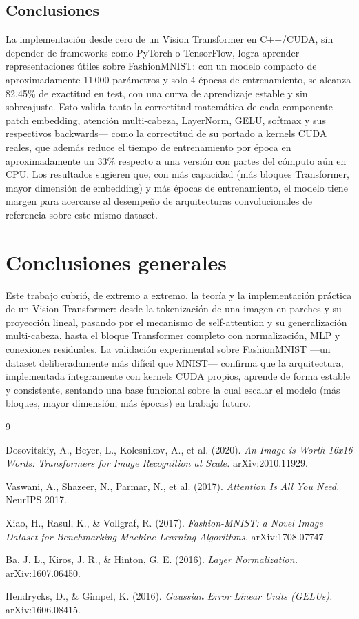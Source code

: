 \documentclass[11pt,a4paper]{article}
\begin{document}
\subsection{Conclusiones}

La implementación desde cero de un Vision Transformer en C++/CUDA, sin
depender de frameworks como PyTorch o TensorFlow, logra aprender
representaciones útiles sobre FashionMNIST: con un modelo compacto de
aproximadamente 11\,000 parámetros y solo 4 épocas de entrenamiento, se
alcanza 82.45\% de exactitud en test, con una curva de aprendizaje estable
y sin sobreajuste. Esto valida tanto la correctitud matemática de cada
componente ---patch embedding, atención multi-cabeza, LayerNorm, GELU,
softmax y sus respectivos backwards--- como la correctitud de su portado a
kernels CUDA reales, que además reduce el tiempo de entrenamiento por época
en aproximadamente un 33\% respecto a una versión con partes del cómputo
aún en CPU. Los resultados sugieren que, con más capacidad (más bloques
Transformer, mayor dimensión de embedding) y más épocas de entrenamiento,
el modelo tiene margen para acercarse al desempeño de arquitecturas
convolucionales de referencia sobre este mismo dataset.

\section{Conclusiones generales}

Este trabajo cubrió, de extremo a extremo, la teoría y la implementación
práctica de un Vision Transformer: desde la tokenización de una imagen en
parches y su proyección lineal, pasando por el mecanismo de self-attention
y su generalización multi-cabeza, hasta el bloque Transformer completo con
normalización, MLP y conexiones residuales. La validación experimental
sobre FashionMNIST ---un dataset deliberadamente más difícil que MNIST---
confirma que la arquitectura, implementada íntegramente con kernels CUDA
propios, aprende de forma estable y consistente, sentando una base
funcional sobre la cual escalar el modelo (más bloques, mayor dimensión,
más épocas) en trabajo futuro.

\begin{thebibliography}{9}

Dosovitskiy, A., Beyer, L., Kolesnikov, A., et al. (2020).
\emph{An Image is Worth 16x16 Words: Transformers for Image Recognition at Scale.}
arXiv:2010.11929.

Vaswani, A., Shazeer, N., Parmar, N., et al. (2017).
\emph{Attention Is All You Need.} NeurIPS 2017.

Xiao, H., Rasul, K., \& Vollgraf, R. (2017).
\emph{Fashion-MNIST: a Novel Image Dataset for Benchmarking Machine Learning Algorithms.}
arXiv:1708.07747.

Ba, J. L., Kiros, J. R., \& Hinton, G. E. (2016).
\emph{Layer Normalization.} arXiv:1607.06450.

Hendrycks, D., \& Gimpel, K. (2016).
\emph{Gaussian Error Linear Units (GELUs).} arXiv:1606.08415.

\end{thebibliography}
\end{document}
